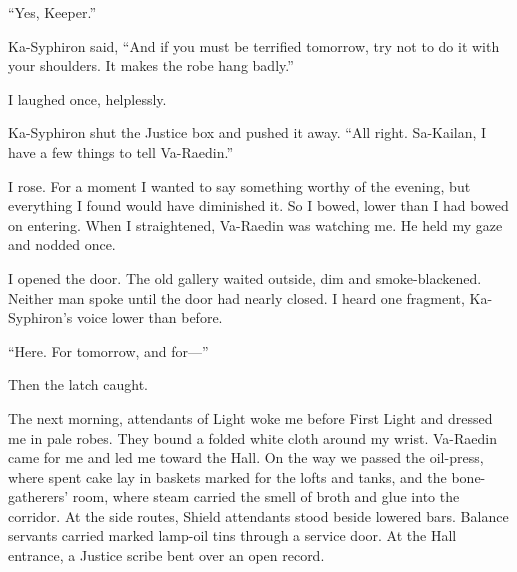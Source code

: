 ``Yes, Keeper.''\par

Ka-Syphiron said, ``And if you must be terrified tomorrow, try not to do it with your shoulders. It makes the robe hang badly.''\par

I laughed once, helplessly.\par

Ka-Syphiron shut the Justice box and pushed it away. ``All right. Sa-Kailan, I have a few things to tell Va-Raedin.''\par

I rose. For a moment I wanted to say something worthy of the evening, but everything I found would have diminished it. So I bowed, lower than I had bowed on entering. When I straightened, Va-Raedin was watching me. He held my gaze and nodded once.\par

I opened the door. The old gallery waited outside, dim and smoke-blackened. Neither man spoke until the door had nearly closed. I heard one fragment, Ka-Syphiron's voice lower than before.\par

``Here. For tomorrow, and for---''\par

Then the latch caught.\par

The next morning, attendants of Light woke me before First Light and dressed me in pale robes. They bound a folded white cloth around my wrist. Va-Raedin came for me and led me toward the Hall. On the way we passed the oil-press, where spent cake lay in baskets marked for the lofts and tanks, and the bone-gatherers' room, where steam carried the smell of broth and glue into the corridor. At the side routes, Shield attendants stood beside lowered bars. Balance servants carried marked lamp-oil tins through a service door. At the Hall entrance, a Justice scribe bent over an open record.\par
 
